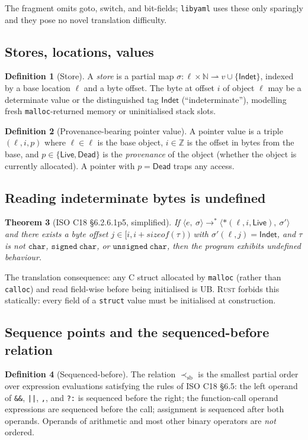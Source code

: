 \documentclass[12pt]{article}
\newcommand{\Conf}[2]{\langle #1,\ #2\rangle}
\newcommand{\reduces}{\longrightarrow}
\newcommand{\Store}{\sigma}
\newcommand{\Loc}{\ell}
\newcommand{\Val}{v}
\newcommand{\Type}{\tau}
\newcommand{\Live}{\mathsf{Live}}
\newcommand{\Dead}{\mathsf{Dead}}
\newcommand{\Indet}{\mathsf{Indet}}
\newcommand{\sequenced}{\prec_{\mathrm{sb}}}
\newcommand{\rust}{\textnormal{\textsc{Rust}}}
\newcommand{\clang}{\textnormal{\textsc{C}}}
\newcommand{\libyaml}{\texttt{libyaml}}
\newtheorem{theorem}{Theorem}[section]
\theoremstyle{definition}
\newtheorem{definition}[theorem]{Definition}
\theoremstyle{remark}
\begin{document}
The fragment omits goto, switch, and bit-fields; \libyaml{} uses these only sparingly and they pose no novel translation difficulty.

\subsection{Stores, locations, values}
\begin{definition}[Store]
A \emph{store} is a partial map \(\Store : \Loc \times \mathbb{N} \rightharpoonup \Val \cup \{\Indet\}\), indexed by a base location \(\Loc\) and a byte offset. The byte at offset \(i\) of object \(\Loc\) may be a determinate value or the distinguished tag \(\Indet\) (``indeterminate''), modelling fresh \texttt{malloc}-returned memory or uninitialised stack slots.
\end{definition}

\begin{definition}[Provenance-bearing pointer value]
\label{def:provenance}
A pointer value is a triple \((\Loc, i, p)\) where \(\Loc \in \Loc\) is the base object, \(i \in \mathbb{Z}\) is the offset in bytes from the base, and \(p \in \{\Live, \Dead\}\) is the \emph{provenance} of the object (whether the object is currently allocated). A pointer with \(p = \Dead\) traps any access.
\end{definition}

\subsection{Reading indeterminate bytes is undefined}
\begin{theorem}[ISO C18 \S{}6.2.6.1p5, simplified]
\label{thm:indet-ub}
If \(\Conf{e}{\Store} \reduces^* \Conf{*\!(\Loc, i, \Live)}{\Store'}\) and there exists a byte offset \(j \in [i, i+\mathit{sizeof}(\Type))\) with \(\Store'(\Loc, j) = \Indet\), and \(\Type\) is not \(\mathtt{char}\), \(\mathtt{signed\ char}\), or \(\mathtt{unsigned\ char}\), then the program exhibits undefined behaviour.
\end{theorem}

The translation consequence: any \clang{} struct allocated by \texttt{malloc} (rather than \texttt{calloc}) and read field-wise before being initialised is UB. \rust{} forbids this statically: every field of a \texttt{struct} value must be initialised at construction.

\subsection{Sequence points and the sequenced-before relation}
\begin{definition}[Sequenced-before]
The relation \(\sequenced\) is the smallest partial order over expression evaluations satisfying the rules of ISO C18 \S{}6.5: the left operand of \texttt{\&\&}, \texttt{||}, \texttt{,}, and \texttt{?:} is sequenced before the right; the function-call operand expressions are sequenced before the call; assignment is sequenced after both operands. Operands of arithmetic and most other binary operators are \emph{not} ordered.
\end{definition}
\end{document}
